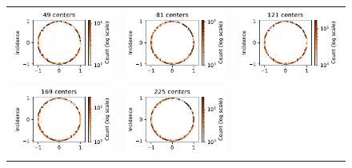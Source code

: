 \documentclass[12pt]{report} %
\begin{document}
\begin{figure}[h]
  \hspace*{-2cm}
  \begin{tabular}{ccc}
    {\includegraphics[width=.4\textwidth]{imagenes/experiments/2d/pde_parabola/distribution_of_errors_L_inf_end_C49.pdf}} &
    \includegraphics[width=.4\textwidth]{imagenes/experiments/2d/pde_parabola/distribution_of_errors_L_inf_end_C81.pdf}   &
    \includegraphics[width=.4\textwidth]{imagenes/experiments/2d/pde_parabola/distribution_of_errors_L_inf_end_C121.pdf}    \\
    \includegraphics[width=.4\textwidth]{imagenes/experiments/2d/pde_parabola/distribution_of_errors_L_inf_end_C169.pdf}  &
    \includegraphics[width=.4\textwidth]{imagenes/experiments/2d/pde_parabola/distribution_of_errors_L_inf_end_C225.pdf}  &

\end{tabular}
\end{figure}
\end{document}
